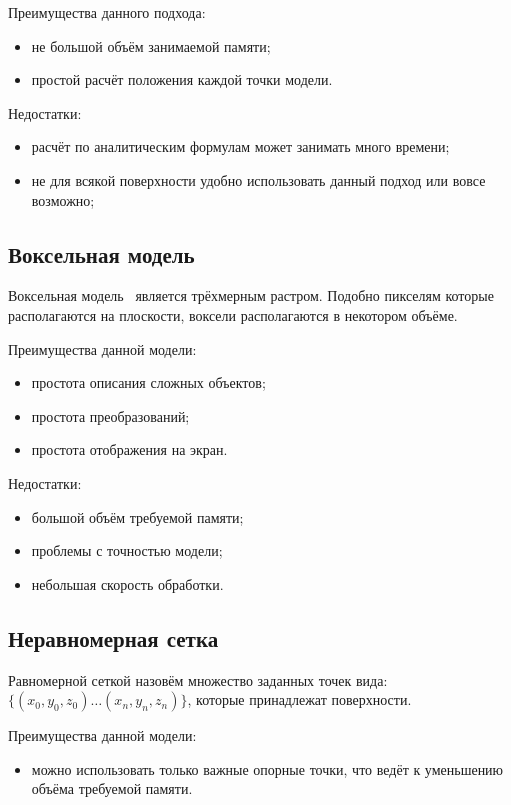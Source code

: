 Преимущества данного подхода:
\begin{itemize}
	\item не большой объём занимаемой памяти;
	\item простой расчёт положения каждой точки модели.
\end{itemize}

Недостатки:
\begin{itemize}
	\item расчёт по аналитическим формулам может занимать много времени;
	\item не для всякой поверхности удобно использовать данный подход или вовсе возможно;
\end{itemize}

\subsection{Воксельная модель}

Воксельная модель~\cite{voxel} является трёхмерным растром. Подобно пикселям которые располагаются на плоскости, воксели располагаются в некотором объёме.

Преимущества данной модели:
\begin{itemize}
	\item простота описания сложных объектов;
	\item простота преобразований;
	\item простота отображения на экран.
\end{itemize}

Недостатки:
\begin{itemize}
	\item большой объём требуемой памяти;
	\item проблемы с точностью модели;
	\item небольшая скорость обработки.
\end{itemize}

\subsection{Неравномерная сетка}

Равномерной сеткой назовём множество заданных точек вида: $\{(x_0, y_0, z_0) \dots (x_n, y_n, z_n)\}$, которые принадлежат поверхности. 

Преимущества данной модели:
\begin{itemize}
	\item можно использовать только важные опорные точки, что ведёт к уменьшению объёма требуемой памяти.
\end{itemize}

